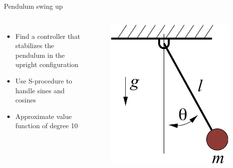 \documentclass[aspectratio=169]{beamer}
\begin{document}
\begin{frame}{Pendulum swing up
\href{https://colab.research.google.com/github/TobiaMarcucci/optimal_control_pisa/blob/master/demos/pendulum_swing_up.ipynb}{}}
\begin{columns}
	\begin{itemize}
		\item
		Find a controller that stabilizes the pendulum in the upright configuration
		\item
		Use S-procedure to handle sines and cosines
		\item
		Approximate value function of degree 10
	\end{itemize}
	\begin{figure}
		\includegraphics[width=\columnwidth]{figures/simple_pend.png}
	\end{figure}
\end{columns}
\end{frame}
\end{document}
